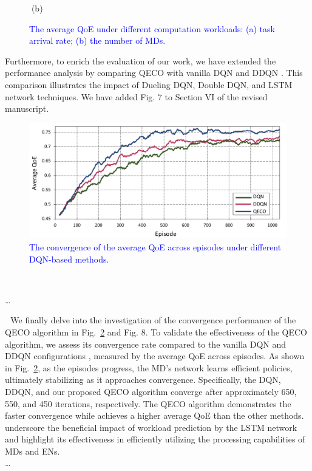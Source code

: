 \documentclass[12pt,draftclsnofoot,onecolumn]{IEEEtran}
\newcommand{\rev}[1]{{\color{blue}#1}} %
\newcommand{\rev}[1]{#1}
\newenvironment{my}[2]%
{\begin{list}{}%
{\setlength{\rightmargin}{#1}\setlength{\leftmargin}{#2}}%


 \item[]{}

} {\end{list}}
\begin{document}
\begin{enumerate}
\begin{figure}[H]
\begin{minipage}[b]{0.33\linewidth}
		\textcolor{white}{i}\hspace{0.6cm}(b)
	\end{minipage}
	
	\caption{\textcolor{blue}{The average QoE under different computation workloads: (a) task arrival rate; (b) the number of MDs.}}
	\label{chart444}
\end{figure} 

Furthermore, to enrich the evaluation of our work, we have extended the performance analysis by comparing QECO with vanilla DQN and DDQN \cite{van2016deep}. This comparison illustrates the impact of Dueling DQN, Double DQN, and LSTM network techniques. We have added Fig. 7 to Section VI of the revised manuscript.

\begin{figure}[H]
	\captionsetup{name=Fig.}
	\centering
	\includegraphics[width=.6\linewidth]{m1}
	\vspace*{-3mm}
	\caption{\textcolor{blue}{The convergence of the average QoE across episodes under different DQN-based methods.}}
	\vspace*{-3mm}
	\label{chart01}
\end{figure}
\begin{my}{1cm}{1cm}
	\rev{
		{\ 
			
			\dots 
			
				\,\,\,\,We finally delve into the investigation of the convergence performance of the QECO algorithm in Fig.~\ref{chart01} and Fig. 8. To validate the effectiveness of the QECO algorithm, we assess its convergence rate compared to the vanilla DQN and DDQN configurations \cite{van2016deep}, measured by the average QoE across episodes. As shown in Fig.~\ref{chart01}, as the episodes progress, the MD's network learns efficient policies, ultimately stabilizing as it approaches convergence. Specifically, the DQN, DDQN, and our proposed QECO algorithm converge after approximately 650, 550, and 450 iterations, respectively. The QECO algorithm demonstrates the faster convergence while achieves a higher average QoE than the other methods. underscore the beneficial impact of workload prediction by the LSTM network and highlight its effectiveness in efficiently utilizing the processing capabilities of  MDs and ENs. \\\dots }}
	

\end{my}
\end{enumerate}
\end{document}
